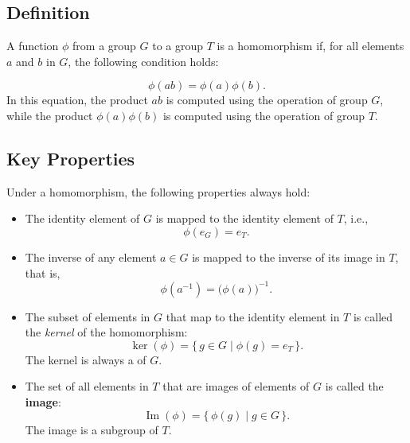 \documentclass[a4paper,12pt]{article}
\theoremstyle{definition}
\begin{document}
\subsection{Definition}

A function $\phi$ from a group $G$ to a group $T$ is a homomorphism if, 
for all elements $a$ and $b$ in $G$, the following condition holds:

\begin{equation*}
\phi(ab) = \phi(a)\phi(b).
\end{equation*}
In this equation, the product $ab$ is computed using the operation of group $G$, while the product $\phi(a)\phi(b)$ is computed using the operation of group $T$.

\subsection{Key Properties}

Under a homomorphism, the following properties always hold:

\begin{itemize}

\item {}  
The identity element of $G$ is mapped to the identity element of $T$, i.e.,
\begin{equation*}
\phi(e_G) = e_T.
\end{equation*}

\item {}  
The inverse of any element $a \in G$ is mapped to the inverse of its image in $T$, that is,
\begin{equation*}
\phi(a^{-1}) = \big(\phi(a)\big)^{-1}.
\end{equation*}

\item {}  
The subset of elements in $G$ that map to the identity element in $T$ is called the \emph{kernel} of the homomorphism:
\begin{equation*}
\ker(\phi) = \{\, g \in G \mid \phi(g) = e_T \,\}.
\end{equation*}
The kernel is always a  of $G$.

\item {}  
The set of all elements in $T$ that are images of elements of $G$ is called the \textbf{image}:
\begin{equation*}
\operatorname{Im}(\phi) = \{\, \phi(g) \mid g \in G \,\}.
\end{equation*}
The image is a subgroup of $T$.

\end{itemize}
\end{document}

